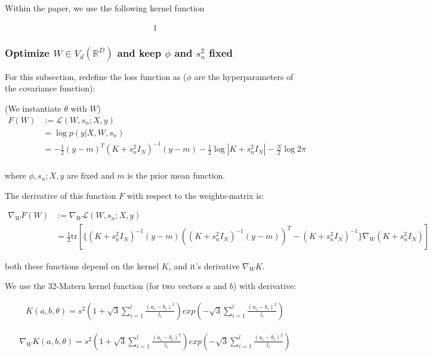Within the paper, we use the following kernel function

\begin{align}
1
\end{align}

\subsubsection{Optimize $W \in V_d(\mathbb{R}^D)$ and keep $\phi$ and $s_n^2$ fixed}

For this subsection, redefine the loss function as ($\phi$ are the hyperparameters of the covariance function):

(We instantiate $\theta$ with $W$)
\begin{align}
F(W) &:= \mathcal{L}(W, s_n; X, y) \\
& = \log p(y | X, W, s_n) \\
& =  -\frac{1}{2} (y - m)^T (K + s_n^2 I_N)^{-1} (y - m) -\frac{1}{2} \log|K + s_n^2 I_N| -\frac{N}{2} \log 2 \pi   \\
\end{align}

where $\phi, s_n; X, y$ are fixed and $m$ is the prior mean function.

The derivative of this function $F$ with respect to the weights-matrix is:

\begin{align}
\nabla_W F(W) &:= \nabla_W \mathcal{L}(W, s_n; X, y) \\
& = \frac{1}{2} \text{tr} \left[ \{ (K + s_n^2 I_N)^{-1} (y-m) \left( (K + s_n^2 I_N)^{-1} (y-m) \right)^T - (K + s_n^2 I_N)^{-1} \} \nabla_W (K + s_n^2 I_N) \right]
\end{align}

both these functions depend on the kernel $K$, and it's derivative $\nabla_W K$.

We use the 32-Matern kernel function (for two vectors $a$ and $b$) with derivative:

\begin{align}
K(a,  b, \theta) = s^2 \left( 1 + \sqrt{3} \sum_{i=1}^l \frac{(a_i - b_i)^2}{ \textit{l}_i} \right) exp\left( - \sqrt{3} \sum_{i=1}^l \frac{(a_i - b_i)^2}{ \textit{l}_i} \right)
\end{align}

\begin{align}
\nabla_W K(a,  b, \theta) = s^2 \left( 1 + \sqrt{3} \sum_{i=1}^l \frac{(a_i - b_i)^2}{ \textit{l}_i} \right) exp\left( - \sqrt{3} \sum_{i=1}^l \frac{(a_i - b_i)^2}{ \textit{l}_i} \right)
\end{align}

